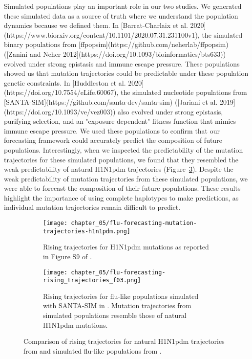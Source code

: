 Simulated populations play an important role in our two studies.
We generated these simulated data as a source of truth where we understand the population dynamics because we defined them.
In [Barrat-Charlaix et al. 2020](https://www.biorxiv.org/content/10.1101/2020.07.31.231100v1), the simulated binary populations from [ffpopsim](https://github.com/neherlab/ffpopsim) ([Zanini and Neher 2012](https://doi.org/10.1093/bioinformatics/bts633)) evolved under strong epistasis and immune escape pressure.
These populations showed us that mutation trajectories could be predictable under these population genetic constraints.
In [Huddleston et al. 2020](https://doi.org/10.7554/eLife.60067), the simulated nucleotide populations from [SANTA-SIM](https://github.com/santa-dev/santa-sim) ([Jariani et al. 2019](https://doi.org/10.1093/ve/vez003)) also evolved under strong epistasis, purifying selection, and an "exposure dependent" fitness function that mimics immune escape pressure.
We used these populations to confirm that our forecasting framework could accurately predict the composition of future populations.
Interestingly, when we inspected the predictability of the mutation trajectories for these simulated populations, we found that they resembled the weak predictability of natural H1N1pdm trajectories (Figure~\ref{fig:mutation-trajectories-comparison}).
Despite the weak predictability of mutation trajectories from these simulated populations, we were able to forecast the composition of their future populations.
These results highlight the importance of using complete haplotypes to make predictions, as individual mutation trajectories remain difficult to predict.

\begin{figure}
  \begin{subfigure}[b]{0.5\textwidth}
    \centering
    \texttt{[image: chapter\_05/flu-forecasting-mutation-trajectories-h1n1pdm.png]}
    \caption{Rising trajectories for H1N1pdm mutations as reported in Figure S9 of \citet{BarratCharlaix2020}.\label{fig:mutation-trajectories-h1n1pdm} }
  \end{subfigure}
  \hfill
  \begin{subfigure}[b]{0.5\textwidth}
    \centering
    \texttt{[image: chapter\_05/flu-forecasting-rising\_trajectories\_f03.png]}
    \caption{Rising trajectories for flu-like populations simulated with SANTA-SIM in \citet{Huddleston2020}.
      Mutation trajectories from simulated populations resemble those of natural H1N1pdm mutations.\label{fig:mutation-trajectories-simulated}}
  \end{subfigure}

  \caption{Comparison of rising trajectories for natural H1N1pdm trajectories from \citet{BarratCharlaix2020} and simulated flu-like populations from \citet{Huddleston2020}. \label{fig:mutation-trajectories-comparison}}
\end{figure}


